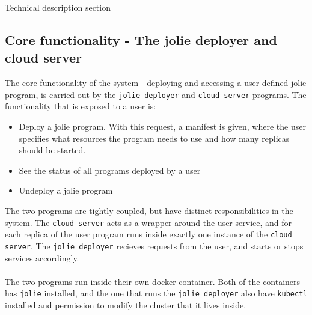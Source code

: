 \documentclass[Report.tex]{subfiles}
\begin{document}
Technical description section
\subsection{Core functionality - The jolie deployer and cloud server}
The core functionality of the system - deploying and accessing a user defined jolie program, is carried out by the {\tt jolie deployer} and {\tt cloud server} programs. The functionality that is exposed to a user is:
\begin{itemize}
\item Deploy a jolie program. With this request, a manifest is given, where the user specifies what resources the program needs to use and how many replicas should be started.
\item See the status of all programs deployed by a user
\item Undeploy a jolie program
\end{itemize}
The two programs are tightly coupled, but have distinct responsibilities in the system. The {\tt cloud server} acts as a wrapper around the user service, and for each replica of the user program runs inside exactly one instance of the {\tt cloud server}. The {\tt jolie deployer} recieves requests from the user, and starts or stops services accordingly.
\\\\
The two programs run inside their own docker container. Both of the containers has {\tt jolie} installed, and the one that runs the {\tt jolie deployer} also have {\tt kubectl} installed and permission to modify the cluster that it lives inside.
\end{document}
